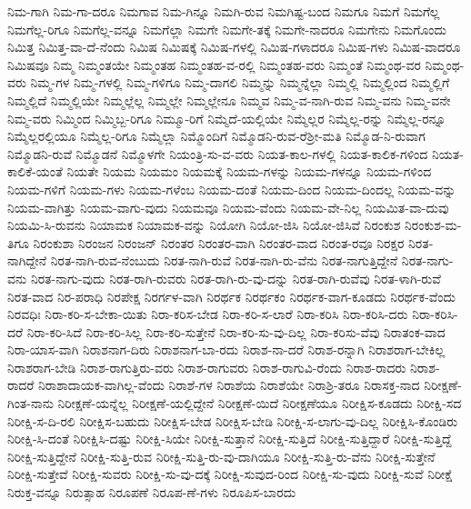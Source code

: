 {ನಿಮ-ಗಾಗಿ
ನಿಮ-ಗಾ-ದರೂ
ನಿಮಗಾವ
ನಿಮ-ಗಿನ್ನೂ
ನಿಮಗಿ-ರುವ
ನಿಮಗಿಷ್ಟ-ಬಂದ
ನಿಮಗೂ
ನಿಮಗೆ
ನಿಮಗೆಲ್ಲ
ನಿಮಗೆಲ್ಲ-ರಿಗೂ
ನಿಮಗೆಲ್ಲ-ವನ್ನೂ
ನಿಮಗೆಲ್ಲಾ
ನಿಮಗೇ
ನಿಮಗೇ-ತಕ್ಕೆ
ನಿಮಗೇ-ನಾದರೂ
ನಿಮಗೇನು
ನಿಮಗೊಂದು
ನಿಮಿತ್ತ
ನಿಮಿತ್ತ-ವಾ-ದೆ-ನೆಂದು
ನಿಮಿಷ
ನಿಮಿಷಕ್ಕೆ
ನಿಮಿಷ-ಗಳಲ್ಲಿ
ನಿಮಿಷ-ಗಳಾದರೂ
ನಿಮಿಷ-ಗಳು
ನಿಮಿಷ-ವಾದರೂ
ನಿಮಿಷವೂ
ನಿಮ್ಮ
ನಿಮ್ಮಂತಯೇ
ನಿಮ್ಮಂತಹ
ನಿಮ್ಮಂತಹ-ವ-ರಲ್ಲಿ
ನಿಮ್ಮಂತಹ-ವರು
ನಿಮ್ಮಂತೆ
ನಿಮ್ಮಂಥ-ವರ
ನಿಮ್ಮಂಥ-ವರು
ನಿಮ್ಮ-ಗಳ
ನಿಮ್ಮ-ಗಳಲ್ಲಿ
ನಿಮ್ಮ-ಗಳಿಗೂ
ನಿಮ್ಮ-ದಾಗಲಿ
ನಿಮ್ಮನ್ನು
ನಿಮ್ಮನ್ನೆಲ್ಲಾ
ನಿಮ್ಮಲ್ಲಿ
ನಿಮ್ಮಲ್ಲಿಂದ
ನಿಮ್ಮಲ್ಲಿಗೆ
ನಿಮ್ಮಲ್ಲಿದೆ
ನಿಮ್ಮಲ್ಲಿಯೇ
ನಿಮ್ಮಲ್ಲೆಲ್ಲ
ನಿಮ್ಮಲ್ಲೇ
ನಿಮ್ಮಲ್ಲೇನೂ
ನಿಮ್ಮವ
ನಿಮ್ಮ-ವ-ನಾಗಿ-ರುವ
ನಿಮ್ಮ-ವನು
ನಿಮ್ಮ-ವನೇ
ನಿಮ್ಮ-ವರು
ನಿಮ್ಮಿಂದ
ನಿಮ್ಮಿಬ್ಬ-ರಿಗೂ
ನಿಮ್ಮೂ-ರಿಗೆ
ನಿಮ್ಮೆದೆ-ಯಲ್ಲಿಯೇ
ನಿಮ್ಮೆಲ್ಲರ
ನಿಮ್ಮೆಲ್ಲ-ರನ್ನು
ನಿಮ್ಮೆಲ್ಲ-ರನ್ನೂ
ನಿಮ್ಮೆಲ್ಲರಲ್ಲಿಯೂ
ನಿಮ್ಮೆಲ್ಲ-ರಿಗೂ
ನಿಮ್ಮೆಲ್ಲಾ
ನಿಮ್ಮೊಂದಿಗೆ
ನಿಮ್ಮೊಡನಿ-ರುವ-ರೆಶ್ರೀ-ಮತಿ
ನಿಮ್ಮೊಡ-ನಿ-ರುವಾಗ
ನಿಮ್ಮೊಡನಿ-ರುವೆ
ನಿಮ್ಮೊಡನೆ
ನಿಮ್ಮೊಳಗೇ
ನಿಯಂತ್ರಿ-ಸು-ವ-ವರು
ನಿಯತ-ಕಾಲ-ಗಳಲ್ಲಿ
ನಿಯತ-ಕಾಲಿಕ-ಗಳಿಂದ
ನಿಯತ-ಕಾಲಿಕೆ-ಯಂತೆ
ನಿಯತೇ
ನಿಯಮ
ನಿಯಮಂ
ನಿಯಮಕ್ಕೆ
ನಿಯಮ-ಗಳನ್ನು
ನಿಯಮ-ಗಳನ್ನೂ
ನಿಯಮ-ಗಳಿಂದ
ನಿಯಮ-ಗಳಿಗೆ
ನಿಯಮ-ಗಳು
ನಿಯಮ-ಗಳೆಂಬ
ನಿಯಮ-ದಂತೆ
ನಿಯಮ-ದಿಂದ
ನಿಯಮ-ದಿಂದಲ್ಲ
ನಿಯಮ-ವನ್ನು
ನಿಯಮ-ವಾಗಿತ್ತು
ನಿಯಮ-ವಾಗು-ವುದು
ನಿಯಮವೂ
ನಿಯಮ-ವೆಂದು
ನಿಯಮ-ವೇ-ನಿಲ್ಲ
ನಿಯಮಿತ-ವಾ-ದುವು
ನಿಯಮಿ-ಸಿ-ರುವನು
ನಿಯಾಮಕ
ನಿಯಾಮಕ-ವನ್ನು
ನಿಯೋಗಿ
ನಿಯೋ-ಜಿಸಿ
ನಿಯೋ-ಜಿಸಿವೆ
ನಿರಂಕುಶ
ನಿರಂಕುಶ-ಮ-ತಿಗೂ
ನಿರಂಕುಶಾ
ನಿರಂಜನ
ನಿರಂಜನ್
ನಿರಂತರ
ನಿರಂತರ-ವಾಗಿ
ನಿರಂತರ-ವಾದ
ನಿರಂತ-ರವೂ
ನಿರಕ್ಷರ
ನಿರತ-ನಾಗಿದ್ದೇನೆ
ನಿರತ-ನಾಗಿ-ರುವ-ನೆಂಬುದು
ನಿರತ-ನಾಗಿ-ರುವೆ
ನಿರತ-ನಾಗಿ-ರು-ವೆನು
ನಿರತ-ನಾಗುತ್ತಿದ್ದೇನೆ
ನಿರತ-ನಾಗು-ವನು
ನಿರತ-ನಾಗು-ವುದು
ನಿರತ-ರಾಗಿ-ರುವರು
ನಿರತ-ರಾಗಿ-ರು-ವು-ದನ್ನು
ನಿರತ-ರಾಗಿ-ರುವೆವು
ನಿರತ-ಳಾಗಿ-ರುವೆ
ನಿರತ-ವಾದ
ನಿರ-ಪರಾಧಿ
ನಿರಪೇಕ್ಷ
ನಿರರ್ಗಳ-ವಾಗಿ
ನಿರರ್ಥಕ
ನಿರರ್ಥಕಂ
ನಿರರ್ಥಕ-ವಾಗ-ಕೂಡದು
ನಿರರ್ಥಕ-ವೆಂದು
ನಿರವಧಿಃ
ನಿರಾ-ಕರಿ-ಸ-ಬೇಕಾ-ಯಿತು
ನಿರಾ-ಕರಿಸ-ಬೇಡ
ನಿರಾ-ಕರಿ-ಸ-ಲಾರೆ
ನಿರಾ-ಕರಿಸಿ
ನಿರಾ-ಕರಿಸಿ-ದರು
ನಿರಾ-ಕರಿಸಿ-ದರೆ
ನಿರಾ-ಕರಿ-ಸಿದೆ
ನಿರಾ-ಕರಿ-ಸಿಲ್ಲ
ನಿರಾ-ಕರಿ-ಸುತ್ತೇನೆ
ನಿರಾ-ಕರಿ-ಸು-ವು-ದಿಲ್ಲ
ನಿರಾ-ಕರಿಸು-ವೆವು
ನಿರಾತಂಕ-ವಾದ
ನಿರಾ-ಯಾಸ-ವಾಗಿ
ನಿರಾಶನಾಗ-ದಿರು
ನಿರಾಶನಾಗ-ಬಾ-ರದು
ನಿರಾಶ-ನಾ-ದರೆ
ನಿರಾಶ-ರನ್ನಾಗಿ
ನಿರಾಶರಾಗ-ಬೇಕಿಲ್ಲ
ನಿರಾಶರಾಗ-ಬೇಡಿ
ನಿರಾಶ-ರಾಗುತ್ತಿರು-ವರು
ನಿರಾಶ-ರಾಗುವರು
ನಿರಾಶ-ರಾಗುವಿ-ರೆಂದು
ನಿರಾಶ-ರಾದರು
ನಿರಾಶ-ರಾದರೆ
ನಿರಾಶಾದಾಯಕ-ವಾಗಿಲ್ಲ-ವೆಂದು
ನಿರಾಶೆ-ಗಳ
ನಿರಾಶೆಯ
ನಿರಾಶೆಯೇ
ನಿರಾಶ್ರಿ-ತರೂ
ನಿರಾಸಕ್ತ-ನಾದ
ನಿರೀಕ್ಷಣೆ-ಗಿಂತ-ನಾನು
ನಿರೀಕ್ಷಣೆ-ಯನ್ನೆಲ್ಲ
ನಿರೀಕ್ಷಣೆ-ಯಲ್ಲಿದ್ದೇನೆ
ನಿರೀಕ್ಷಣೆ-ಯಿದೆ
ನಿರೀಕ್ಷಣೆಯೂ
ನಿರೀಕ್ಷಿಸ-ಕೂಡದು
ನಿರೀಕ್ಷಿ-ಸದ
ನಿರೀಕ್ಷಿ-ಸ-ದಿ-ರಲಿ
ನಿರೀಕ್ಷಿಸ-ಬಹುದು
ನಿರೀಕ್ಷಿಸ-ಬೇಡ
ನಿರೀಕ್ಷಿಸ-ಬೇಡಿ
ನಿರೀಕ್ಷಿ-ಸ-ಲಾಗು-ವು-ದಿಲ್ಲ
ನಿರೀಕ್ಷಿಸಿ-ಕೊಂಡಿರು
ನಿರೀಕ್ಷಿ-ಸಿ-ದಂತೆ
ನಿರೀಕ್ಷಿಸಿ-ದಷ್ಟು
ನಿರೀಕ್ಷಿ-ಸಿಯೇ
ನಿರೀಕ್ಷಿ-ಸುತ್ತಾನೆ
ನಿರೀಕ್ಷಿ-ಸುತ್ತಿದೆ
ನಿರೀಕ್ಷಿ-ಸುತ್ತಿದ್ದಾರೆ
ನಿರೀಕ್ಷಿ-ಸುತ್ತಿದ್ದೆ
ನಿರೀಕ್ಷಿ-ಸುತ್ತಿದ್ದೇನೆ
ನಿರೀಕ್ಷಿ-ಸುತ್ತಿ-ರುವ
ನಿರೀಕ್ಷಿ-ಸುತ್ತಿ-ರು-ವು-ದಾಗಿಯೂ
ನಿರೀಕ್ಷಿ-ಸುತ್ತಿ-ರು-ವೆನು
ನಿರೀಕ್ಷಿ-ಸುತ್ತೇನೆ
ನಿರೀಕ್ಷಿ-ಸುತ್ತೇವೆ
ನಿರೀಕ್ಷಿ-ಸುವರು
ನಿರೀಕ್ಷಿ-ಸು-ವು-ದಕ್ಕೆ
ನಿರೀಕ್ಷಿ-ಸುವುದ-ರಿಂದ
ನಿರೀಕ್ಷಿ-ಸು-ವುದು
ನಿರೀಕ್ಷಿ-ಸುವೆ
ನಿರೀಕ್ಷೆ
ನಿರುಕ್ತ-ವನ್ನೂ
ನಿರುತ್ಸಾಹ
ನಿರೂಪಣೆ
ನಿರೂಪ-ಣೆ-ಗಳು
ನಿರೂಪಿಸ-ಬಾರದು
}
